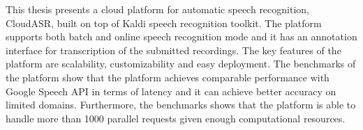 This thesis presents a cloud platform for automatic speech recognition, CloudASR,
  built on top of Kaldi speech recognition toolkit.
The platform supports both batch and online speech recognition mode
  and it has an annotation interface for transcription of the submitted recordings.
The key features of the platform are scalability, customizability and easy deployment.
The benchmarks of the platform show
  that the platform achieves comparable performance with Google Speech API in terms of latency
  and it can achieve better accuracy on limited domains.
Furthermore, the benchmarks shows that the platform is able to handle more than 1000 parallel requests given enough computational resources.
\bye
